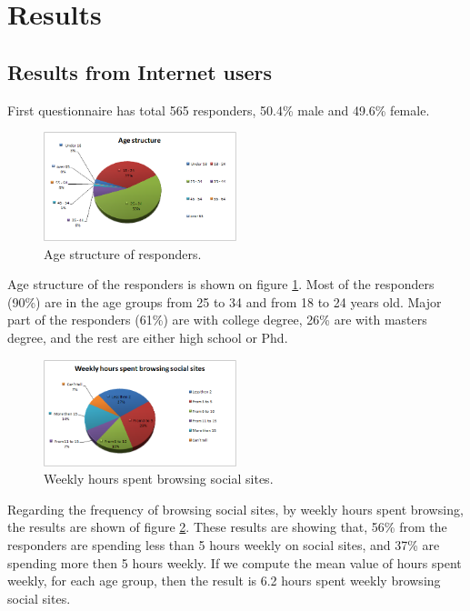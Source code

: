 \documentclass[conference]{IEEEtran}
\begin{document}
\section{Results}

\subsection{Results from Internet users}

First questionnaire has total 565 responders, 50.4\% male and 49.6\% female.

\begin{figure}
\centering
\includegraphics[width=0.5\textwidth]{viral-images/age_structure}
\caption{Age structure of responders.}
\label{fig:age_structure}
\end{figure}

Age structure of the responders is shown on figure \ref{fig:age_structure}.
Most of the responders (90\%) are in the age groups from 25 to 34 and from 18 to 24
years old. Major part of the responders (61\%) are with college degree, 26\% are
with masters degree, and the rest are either high school or Phd.

\begin{figure}
\centering
\includegraphics[width=0.5\textwidth]{viral-images/weekly_hours}
\caption{Weekly hours spent browsing social sites.}
\label{fig:weekly_hours}
\end{figure}

Regarding the frequency of browsing social sites, by weekly hours spent
browsing, the results are shown of figure \ref{fig:weekly_hours}. These results
are showing that, 56\% from the responders are spending less than 5 hours
weekly on social sites, and 37\% are spending more then 5 hours weekly. If we
compute the mean value of hours spent weekly, for each age group, then the
result is 6.2 hours spent weekly browsing social sites.
\end{document}
